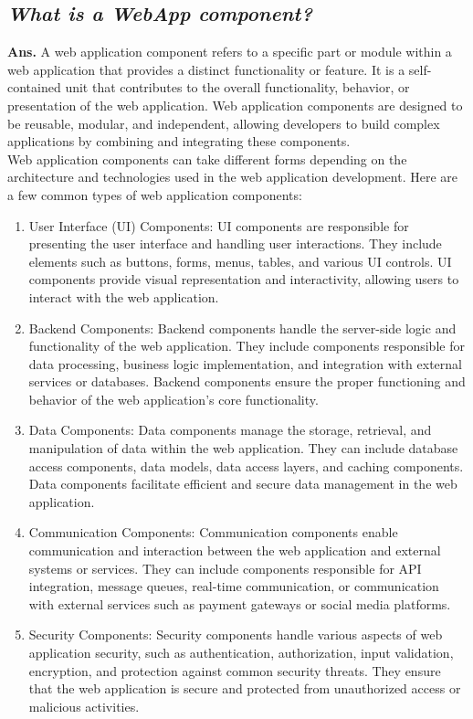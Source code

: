 \documentclass{article}
\begin{document}
\subsection{\textit{What is a WebApp component?}}
\textbf{Ans.} A web application component refers to a specific part or module within a web application that provides a distinct functionality or feature. It is a self-contained unit that contributes to the overall functionality, behavior, or presentation of the web application. Web application components are designed to be reusable, modular, and independent, allowing developers to build complex applications by combining and integrating these components.\\

Web application components can take different forms depending on the architecture and technologies used in the web application development. Here are a few common types of web application components:
\begin{enumerate}
    \item User Interface (UI) Components: UI components are responsible for presenting the user interface and handling user interactions. They include elements such as buttons, forms, menus, tables, and various UI controls. UI components provide visual representation and interactivity, allowing users to interact with the web application.
    \item Backend Components: Backend components handle the server-side logic and functionality of the web application. They include components responsible for data processing, business logic implementation, and integration with external services or databases. Backend components ensure the proper functioning and behavior of the web application's core functionality.
    \item Data Components: Data components manage the storage, retrieval, and manipulation of data within the web application. They can include database access components, data models, data access layers, and caching components. Data components facilitate efficient and secure data management in the web application.
    \item Communication Components: Communication components enable communication and interaction between the web application and external systems or services. They can include components responsible for API integration, message queues, real-time communication, or communication with external services such as payment gateways or social media platforms.
    \item Security Components: Security components handle various aspects of web application security, such as authentication, authorization, input validation, encryption, and protection against common security threats. They ensure that the web application is secure and protected from unauthorized access or malicious activities.
\end{enumerate}
\end{document}
